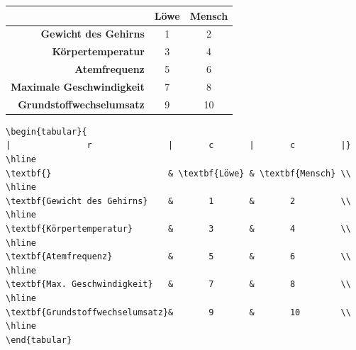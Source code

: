 \documentclass["WS\space 16-17\space -\space LaTeX-Kurs\space -\space Praesentation\space -\space 2.tex"]{subfiles}
\begin{document}
\begin{frame}[fragile]
		\begin{outputbox}
			\vspace{-0.8cm}
		\begin{center}
			\begin{tabular}{|r|c|c|}
				\hline
				&	\textbf{Löwe}				& \textbf{Mensch} 	\\ 	\hline
				\textbf{Gewicht des Gehirns}		&			1					& 		2			\\ 	\hline
				\textbf{Körpertemperatur}			&			3					& 		4			\\	\hline
				\textbf{Atemfrequenz}				&			5					& 		6			\\	\hline
				\textbf{Maximale Geschwindigkeit}	&			7					& 		8			\\ 	\hline
				\textbf{Grundstoffwechselumsatz}	&			9					& 		10			\\	\hline
			\end{tabular}
		\end{center}
	
	\end{outputbox}
	\vspace{-0.4cm}
	\begin{lstlisting}
\begin{tabular}{
|				r				|		c		|		c		  |}
\hline
\textbf{}						& \textbf{Löwe}	& \textbf{Mensch} \\ 
\hline
\textbf{Gewicht des Gehirns}	&		1		& 		2	      \\ 
\hline
\textbf{Körpertemperatur}		&		3		& 		4		  \\ 
\hline
\textbf{Atemfrequenz}			&		5		& 		6	      \\ 
\hline
\textbf{Max. Geschwindigkeit}	&		7		& 		8		  \\ 
\hline
\textbf{Grundstoffwechselumsatz}&		9		& 		10	      \\ 
\hline
\end{tabular}
\end{lstlisting}
\end{frame}
\end{document}

